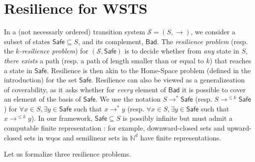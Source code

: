 \documentclass[runningheads]{llncs}
\newcommand{\problemx}[3]{
	\vspace{0.2cm}
\par\noindent\underline{\sc#1}\par\nobreak\vskip.2\baselineskip
\begingroup\clubpenalty10000\widowpenalty10000
\setbox0\hbox{\bf INPUT:\ }\setbox1\hbox{\bf QUESTION:\ }
\dimen0=\wd0\ifnum\wd1>\dimen0\dimen0=\wd1\fi
\vskip-\parskip\noindent
\hbox to\dimen0{\box0\hfil}\hangindent\dimen0\hangafter1\ignorespaces#2\par
\vskip-\parskip\noindent
\hbox to\dimen0{\box1\hfil}\hangindent\dimen0\hangafter1\ignorespaces#3\par
\endgroup
	\vspace{-0.2cm}
}
\newcommand{\Bad}{\textsf{Bad}}
\newcommand{\Safe}{\textsf{Safe}}
\begin{document}
	\vspace{-1.2cm}


\section{Resilience for WSTS}



In a (not necessarly ordered) transition system $\mathscr{S}=(S,\rightarrow)$, we consider a subset of states $\Safe \subseteq S$, and its complement, $\Bad$.
The \emph{resilience problem} (resp. the \emph{$k$-resilience problem}) for $(\mathscr{S},\Safe)$ is to decide whether from \emph{any} state in 
$S$, \emph{there exists} a path (resp. a path of length smaller than or equal to $k$) that reaches a state in $\Safe$. Resilience is then akin to the Home-Space problem (defined in the introduction) for the set $\Safe$. Resilience can also be viewed as a generalizeation
 of coverability, as
it asks whether for \emph{every} element of $\Bad$ it is possible to cover an element of the basis of $\Safe$.
We use the notation 
$S \longrightarrow^{*} \Safe$ (resp. $S \longrightarrow^{\leq k} \Safe$)
 for 
$\forall x \in S, \exists y \in \Safe$ 
 such that $x \longrightarrow^{*} y$ 
  (resp.  $\forall x \in S, \exists y \in \Safe$ such that $x \longrightarrow^{\leq k} y$).
  In our framework, $\Safe \subseteq S$  is possibly infinite but  must admit a computable finite representation : for example, downward-closed sets and upward-closed sets in wqos and semilinear sets in $\mathbb{N}^d$ have finite representations. 





Let us formalize three resilience problems.

\end{document}

